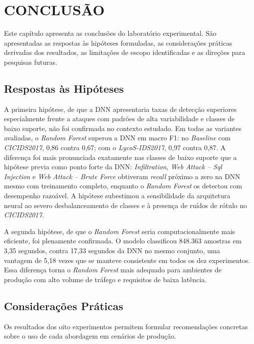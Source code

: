 \chapter{CONCLUSÃO}

Este capítulo apresenta as conclusões do laboratório experimental. São apresentadas as respostas às hipóteses formuladas, as considerações práticas derivadas dos resultados, as limitações de escopo identificadas e as direções para pesquisas futuras.

\section{Respostas às Hipóteses}

A primeira hipótese, de que a DNN apresentaria taxas de detecção superiores especialmente frente a ataques com padrões de alta variabilidade e classes de baixo suporte, não foi confirmada no contexto estudado. Em todas as variantes avaliadas, o \textit{Random Forest} superou a DNN em macro F1: no \textit{Baseline} com \textit{CICIDS2017}, 0,86 contra 0,67; com o \textit{LycoS-IDS2017}, 0,97 contra 0,87. A diferença foi mais pronunciada exatamente nas classes de baixo suporte que a hipótese previa como ponto forte da DNN: \textit{Infiltration}, \textit{Web Attack -- Sql Injection} e \textit{Web Attack -- Brute Force} obtiveram \textit{recall} próximo a zero na DNN mesmo com treinamento completo, enquanto o \textit{Random Forest} os detectou com desempenho razoável. A hipótese subestimou a sensibilidade da arquitetura neural ao severo desbalanceamento de classes e à presença de ruídos de rótulo no \textit{CICIDS2017}.

A segunda hipótese, de que o \textit{Random Forest} seria computacionalmente mais eficiente, foi plenamente confirmada. O modelo classificou 848.363 amostras em 3,35 segundos, contra 17,33 segundos da DNN no mesmo conjunto, uma vantagem de 5,18 vezes que se manteve consistente em todos os dez experimentos. Essa diferença torna o \textit{Random Forest} mais adequado para ambientes de produção com alto volume de tráfego e requisitos de baixa latência.

\section{Considerações Práticas}

Os resultados dos oito experimentos permitem formular recomendações concretas sobre o uso de cada abordagem em cenários de produção.

